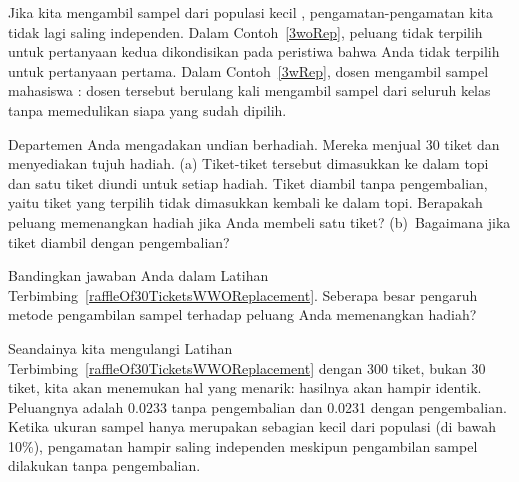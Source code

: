 Jika kita mengambil sampel dari populasi kecil , pengamatan-pengamatan kita tidak lagi saling independen. Dalam Contoh~\ref{3woRep}, peluang tidak terpilih untuk pertanyaan kedua dikondisikan pada peristiwa bahwa Anda tidak terpilih untuk pertanyaan pertama. Dalam Contoh~\ref{3wRep}, dosen mengambil sampel mahasiswa : dosen tersebut berulang kali mengambil sampel dari seluruh kelas tanpa memedulikan siapa yang sudah dipilih. 

\begin{exercisewrap}
\begin{nexercise} \label{raffleOf30TicketsWWOReplacement}
Departemen Anda mengadakan undian berhadiah. Mereka menjual 30 tiket dan menyediakan tujuh hadiah. (a) Tiket-tiket tersebut dimasukkan ke dalam topi dan satu tiket diundi untuk setiap hadiah. Tiket diambil tanpa pengembalian, yaitu tiket yang terpilih tidak dimasukkan kembali ke dalam topi. Berapakah peluang memenangkan hadiah jika Anda membeli satu tiket? (b)~Bagaimana jika tiket diambil dengan pengembalian?\footnotemark
\end{nexercise}
\end{exercisewrap}

\begin{exercisewrap}
\begin{nexercise} \label{followUpToRaffleOf30TicketsWWOReplacement}
Bandingkan jawaban Anda dalam Latihan Terbimbing~\ref{raffleOf30TicketsWWOReplacement}. Seberapa besar pengaruh metode pengambilan sampel terhadap peluang Anda memenangkan hadiah?\footnotemark
\end{nexercise}
\end{exercisewrap}

Seandainya kita mengulangi Latihan Terbimbing~\ref{raffleOf30TicketsWWOReplacement} dengan 300 tiket, bukan 30 tiket, kita akan menemukan hal yang menarik: hasilnya akan hampir identik. Peluangnya adalah 0.0233 tanpa pengembalian dan 0.0231 dengan pengembalian. Ketika ukuran sampel hanya merupakan sebagian kecil dari populasi (di bawah 10\%), pengamatan hampir saling independen meskipun pengambilan sampel dilakukan tanpa pengembalian.


{}
